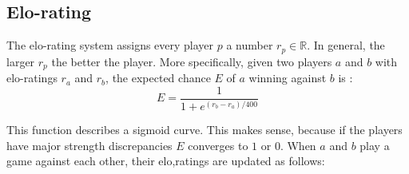 \documentclass[12pt]{article}
\begin{document}
\subsection{Elo-rating} \label{sec:Evaluation:elo-rating}
The elo-rating system assigns every player \(p\) a number \(r_p \in \mathbb{R}\). In general, the larger \(r_p\) the better the player. More specifically, given two players \(a\) and \(b\) with elo-ratings \(r_a\) and \(r_b\), the expected chance \(E\) of \(a\) winning against \(b\) is \cite{silver2018general}:
\begin{equation} \label{eq:elo_pred}
E = \frac{1}{1 + e^{(r_b-r_a)/400}}
\end{equation}
\begin{center}

\end{center}
This function describes a sigmoid curve. This makes sense, because if the players have major strength discrepancies \(E\) converges to \(1\) or \(0\). When \(a\) and \(b\) play a game against each other, their elo,ratings are updated as follows\cite{elo1978rating}:
\end{document}
